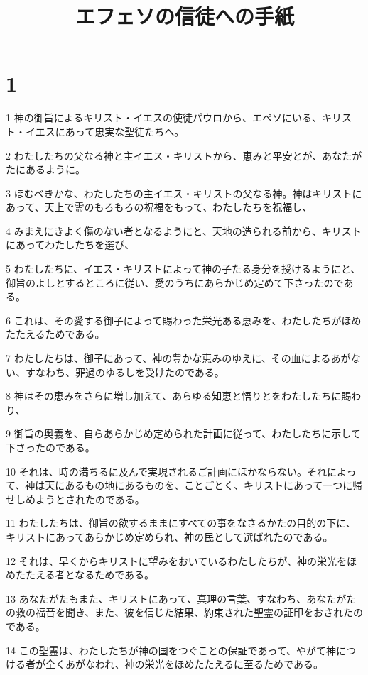 

\title{エフェソの信徒への手紙}


\chapter{1}

\par 1 神の御旨によるキリスト・イエスの使徒パウロから、エペソにいる、キリスト・イエスにあって忠実な聖徒たちへ。
\par 2 わたしたちの父なる神と主イエス・キリストから、恵みと平安とが、あなたがたにあるように。
\par 3 ほむべきかな、わたしたちの主イエス・キリストの父なる神。神はキリストにあって、天上で霊のもろもろの祝福をもって、わたしたちを祝福し、
\par 4 みまえにきよく傷のない者となるようにと、天地の造られる前から、キリストにあってわたしたちを選び、
\par 5 わたしたちに、イエス・キリストによって神の子たる身分を授けるようにと、御旨のよしとするところに従い、愛のうちにあらかじめ定めて下さったのである。
\par 6 これは、その愛する御子によって賜わった栄光ある恵みを、わたしたちがほめたたえるためである。
\par 7 わたしたちは、御子にあって、神の豊かな恵みのゆえに、その血によるあがない、すなわち、罪過のゆるしを受けたのである。
\par 8 神はその恵みをさらに増し加えて、あらゆる知恵と悟りとをわたしたちに賜わり、
\par 9 御旨の奥義を、自らあらかじめ定められた計画に従って、わたしたちに示して下さったのである。
\par 10 それは、時の満ちるに及んで実現されるご計画にほかならない。それによって、神は天にあるもの地にあるものを、ことごとく、キリストにあって一つに帰せしめようとされたのである。
\par 11 わたしたちは、御旨の欲するままにすべての事をなさるかたの目的の下に、キリストにあってあらかじめ定められ、神の民として選ばれたのである。
\par 12 それは、早くからキリストに望みをおいているわたしたちが、神の栄光をほめたたえる者となるためである。
\par 13 あなたがたもまた、キリストにあって、真理の言葉、すなわち、あなたがたの救の福音を聞き、また、彼を信じた結果、約束された聖霊の証印をおされたのである。
\par 14 この聖霊は、わたしたちが神の国をつぐことの保証であって、やがて神につける者が全くあがなわれ、神の栄光をほめたたえるに至るためである。
